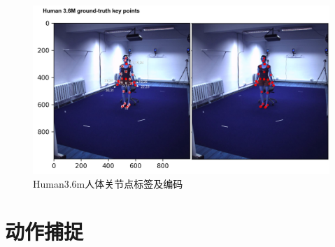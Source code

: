 \begin{figure}[h]
	\centering
	\includegraphics[scale=0.4]{figures/12.png}
	\caption{Human3.6m人体关节点标签及编码}
	\label{fig:f12}
\end{figure}


\section{动作捕捉}

